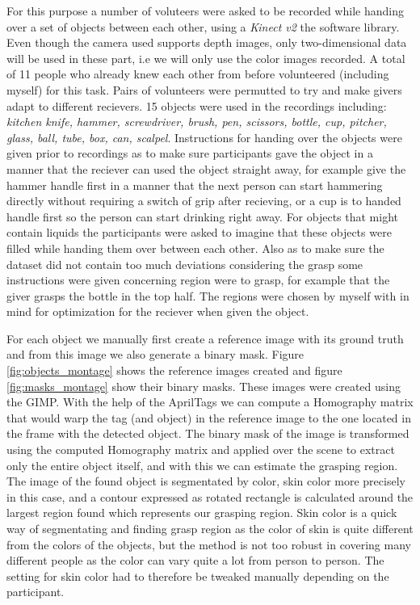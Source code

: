 For this purpose a number of voluteers were asked to be recorded while handing over a set of objects between each other, using a \emph{Kinect v2} the \textcite{libfreenect2} software library. Even though the camera used supports depth images, only two-dimensional data will be used in these part, i.e we will only use the color images recorded. A total of 11 people who already knew each other from before volunteered (including myself) for this task.  Pairs of volunteers were permutted to try and make givers adapt to different recievers. 15 objects were used in the recordings including: \emph{kitchen knife, hammer, screwdriver, brush, pen, scissors, bottle, cup, pitcher, glass, ball, tube, box, can, scalpel}. Instructions for handing over the objects were given prior to recordings as to make sure participants gave the object in a manner that the reciever can used the object straight away, for example give the hammer handle first in a manner that the next person can start hammering directly without requiring a switch of grip after recieving, or a cup is to handed handle first so the person can start drinking right away. For objects that might contain liquids the participants were asked to imagine that these objects were filled while handing them over between each other. Also as to make sure the dataset did not contain too much deviations considering the grasp some instructions were given concerning region were to grasp, for example that the giver grasps the bottle in the top half. The regions were chosen by myself with in mind for optimization for the reciever when given the object.

For each object we manually first create a reference image with its ground truth and from this image we also generate a binary mask. Figure \ref{fig:objects_montage} shows the reference images created and figure \ref{fig:masks_montage} show their binary masks. These images were created using the GIMP. With the help of the AprilTags we can compute a Homography matrix that would warp the tag (and object) in the reference image to the one located in the frame with the detected object. The binary mask of the image is transformed using the computed Homography matrix and applied over the scene to extract only the entire object itself, and with this we can estimate the grasping region. The image of the found object is segmentated by color, skin color more precisely in this case, and a contour expressed as rotated rectangle is calculated around the largest region found which represents our grasping region. Skin color is a quick way of segmentating and finding grasp region as the color of skin is quite different from the colors of the objects, but the method is not too robust in covering many different people as the color can vary quite a lot from person to person. The setting for skin color had to therefore be tweaked manually depending on the participant.

